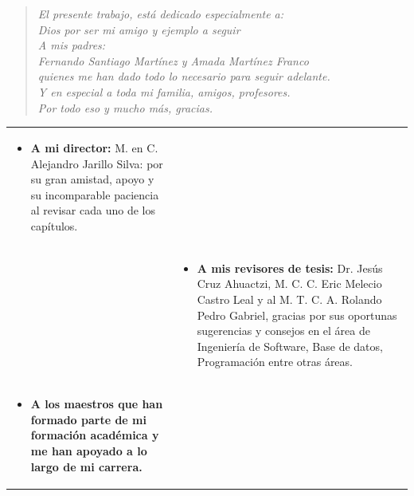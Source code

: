 \dedication

\hbox{ }

\vfill

\begin{quote}
\raggedleft \em El presente trabajo, está dedicado especialmente a: \\
Dios por ser mi amigo y ejemplo a seguir\\

A mis padres: \\
Fernando Santiago Martínez y Amada Martínez Franco\\
quienes me han dado todo lo necesario para seguir adelante.\\
Y en especial a toda mi familia, amigos, profesores.\\
Por todo eso y mucho más, gracias.
\end{quote}

\vfill

\cleardoublepage \thispagestyle{empty}

\begin{acknowledgments}
\begin{table}[h]

\begin{center}
\begin{tabular}{p{8cm}p{8cm}}
 \begin{itemize}
   \item \textbf{A mi director:} M. en C. Alejandro Jarillo Silva: por su gran amistad, apoyo y su incomparable paciencia al revisar cada uno de los capítulos.
 \end{itemize}
   &  \\

   & \begin{itemize} \item \textbf{A mis revisores de tesis:}
       Dr. Jesús Cruz Ahuactzi, M. C. C. Eric Melecio Castro Leal y al M. T. C. A. Rolando Pedro Gabriel, gracias por sus oportunas sugerencias y consejos en el área de Ingeniería de Software, Base de datos, Programación entre otras áreas.
   \end{itemize}\\
 \begin{itemize}
   \item \textbf{A los maestros que han formado parte de mi formación académica y me han apoyado a lo largo de mi carrera.}

 \end{itemize}
   &  \\
\end{tabular}
\end{center}
\end{table}


\end{acknowledgments}
